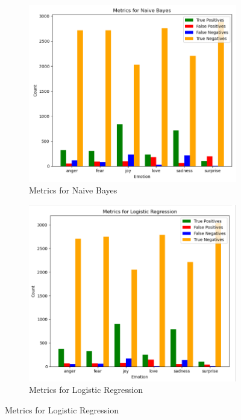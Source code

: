 \begin{figure}[h!]
	\centering
	\begin{subfigure}[b]{0.45\textwidth}
		\centering
		\includegraphics[width=\textwidth]{metrics_naive_bayes.png}
		\caption{Metrics for Naive Bayes}
		\label{fig:metrics_evaluation_naive_bayes}
	\end{subfigure}
	\hfill
	\begin{subfigure}[b]{0.45\textwidth}
		\centering
		\includegraphics[width=\textwidth]{metrics_logistic_regression.png}
		\caption{Metrics for Logistic Regression}
		\label{fig:metrics_evaluation_logistic_regression}
	\end{subfigure}
	

\end{figure}
